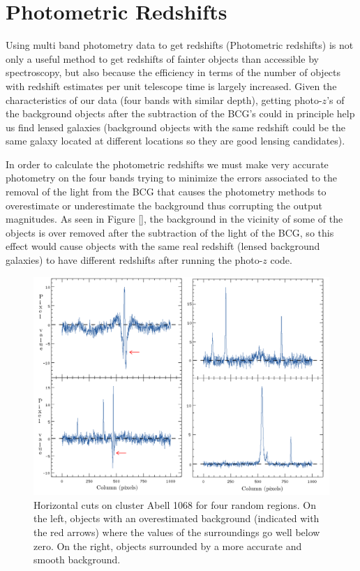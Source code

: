 \section{Photometric Redshifts}

Using multi band photometry data to get redshifts (Photometric redshifts) is not only a useful method to get redshifts of fainter objects than accessible by spectroscopy, but also because the efficiency in terms of the number of objects with redshift estimates per unit telescope time is largely increased. Given the characteristics of our data (four bands with similar depth), getting photo-$z$'s of the background objects after the subtraction of the BCG's could in principle help us find lensed galaxies (background objects with the same redshift could be the same galaxy located at different locations so they are good lensing candidates).

In order to calculate the photometric redshifts we must make very accurate photometry on the four bands trying to minimize the errors associated to the removal of the light from the BCG that causes the photometry methods to overestimate or underestimate the background thus corrupting the output magnitudes. As seen in Figure [], the background in the vicinity of some of the objects is over removed after the subtraction of the light of the BCG, so this effect would cause objects with the same real redshift (lensed background galaxies) to have different redshifts after running the photo-$z$ code.

\begin{figure}[H]
\centering
\includegraphics[width=15cm]{images/horizontal_cuts.png}
\caption[Horizontal cuts to show overestimated background]{Horizontal cuts on cluster Abell 1068 for four random regions. On the left, objects with an overestimated background (indicated with the red arrows) where the values of the surroundings go well below zero. On the right, objects surrounded by a more accurate and smooth background.}
\end{figure}

